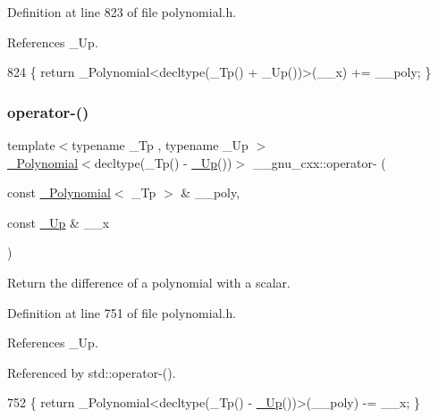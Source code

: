 Definition at line 823 of file polynomial.\+h.



References \+\_\+\+Up.


\begin{DoxyCode}
824     \{ \textcolor{keywordflow}{return} \_Polynomial<decltype(\_Tp() + \_Up())>(\_\_x) += \_\_poly; \}
\end{DoxyCode}
\mbox{\label{namespace____gnu__cxx_abc583ac0684f0aff079c6014f3d84c1d}} 
\subsubsection{\texorpdfstring{operator-\/()}{operator-()}\hspace{0.1cm}{\footnotesize\ttfamily [1/3]}}
{\footnotesize\ttfamily template$<$typename \+\_\+\+Tp , typename \+\_\+\+Up $>$ \\
\hyperlink{class____gnu__cxx_1_1__Polynomial}{\+\_\+\+Polynomial}$<$decltype(\+\_\+\+Tp() -\/ \hyperlink{namespace____gnu__cxx_ab693ea357b6429b331e0bf09f9442385}{\+\_\+\+Up}())$>$ \+\_\+\+\_\+gnu\+\_\+cxx\+::operator-\/ (\begin{DoxyParamCaption}\item[{const \hyperlink{class____gnu__cxx_1_1__Polynomial}{\+\_\+\+Polynomial}$<$ \+\_\+\+Tp $>$ \&}]{\+\_\+\+\_\+poly,  }\item[{const \hyperlink{namespace____gnu__cxx_ab693ea357b6429b331e0bf09f9442385}{\+\_\+\+Up} \&}]{\+\_\+\+\_\+x }\end{DoxyParamCaption})\hspace{0.3cm}{\ttfamily [inline]}}

Return the difference of a polynomial with a scalar. 

Definition at line 751 of file polynomial.\+h.



References \+\_\+\+Up.



Referenced by std\+::operator-\/().


\begin{DoxyCode}
752     \{ \textcolor{keywordflow}{return} \_Polynomial<decltype(\_Tp() - \hyperlink{namespace____gnu__cxx_ab693ea357b6429b331e0bf09f9442385}{\_Up}())>(\_\_poly) -= \_\_x; \}
\end{DoxyCode}
\mbox{\label{namespace____gnu__cxx_a4609eee7a71e3be3a103df9556fab9b4}} 

